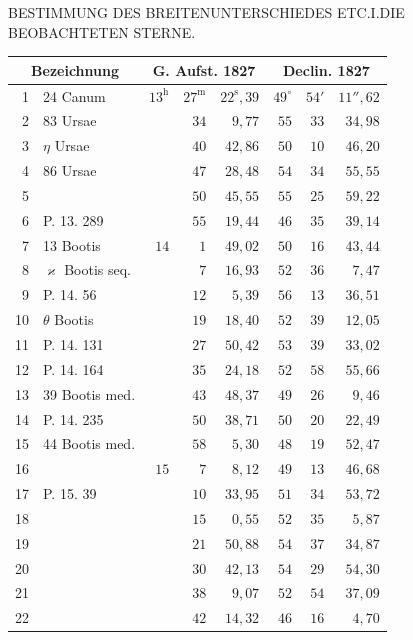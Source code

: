 \clearpage
\noindent\parbox[t]{\dimexpr\textwidth-10mm\relax}{\centering\scriptsize BESTIMMUNG DES BREITENUNTERSCHIEDES ETC.\quad I.\quad DIE BEOBACHTETEN STERNE.}\par
\begin{center}
\begin{minipage}[t]{.49\textwidth}\centering
{\scriptsize\setlength{\tabcolsep}{1.2pt}\renewcommand{\arraystretch}{1.2}\begin{tabular}{r|l|rrr|rrr|}
\multicolumn{2}{c|}{Bezeichnung}&\multicolumn{3}{c|}{G. Aufst. 1827}&\multicolumn{3}{c|}{Declin. 1827}\\\hline
1&24 Canum&$13^{\mathrm h}$&$27^{\mathrm m}$&$22^{\mathrm s}{,}39$&$49^\circ$&$54'$&$11''{,}62$\\
2&83 Ursae&&$34$&$9{,}77$&$55$&$33$&$34{,}98$\\
3&$\eta$ Ursae&&$40$&$42{,}86$&$50$&$10$&$46{,}20$\\
4&86 Ursae&&$47$&$28{,}48$&$54$&$34$&$55{,}55$\\
5&&&$50$&$45{,}55$&$55$&$25$&$59{,}22$\\
6&P. 13. 289&&$55$&$19{,}44$&$46$&$35$&$39{,}14$\\
7&13 Bootis&$14$&$1$&$49{,}02$&$50$&$16$&$43{,}44$\\
8&$\varkappa$ Bootis seq.&&$7$&$16{,}93$&$52$&$36$&$7{,}47$\\
9&P. 14. 56&&$12$&$5{,}39$&$56$&$13$&$36{,}51$\\
10&$\theta$ Bootis&&$19$&$18{,}40$&$52$&$39$&$12{,}05$\\
11&P. 14. 131&&$27$&$50{,}42$&$53$&$39$&$33{,}02$\\
12&P. 14. 164&&$35$&$24{,}18$&$52$&$58$&$55{,}66$\\
13&39 Bootis med.&&$43$&$48{,}37$&$49$&$26$&$9{,}46$\\
14&P. 14. 235&&$50$&$38{,}71$&$50$&$20$&$22{,}49$\\
15&44 Bootis med.&&$58$&$5{,}30$&$48$&$19$&$52{,}47$\\
16&&$15$&$7$&$8{,}12$&$49$&$13$&$46{,}68$\\
17&P. 15. 39&&$10$&$33{,}95$&$51$&$34$&$53{,}72$\\
18&&&$15$&$0{,}55$&$52$&$35$&$5{,}87$\\
19&&&$21$&$50{,}88$&$54$&$37$&$34{,}87$\\
20&&&$30$&$42{,}13$&$54$&$29$&$54{,}30$\\
21&&&$38$&$9{,}07$&$52$&$54$&$37{,}09$\\
22&&&$42$&$14{,}32$&$46$&$16$&$4{,}70$\\

\end{tabular}}
\end{minipage}
\end{center}
